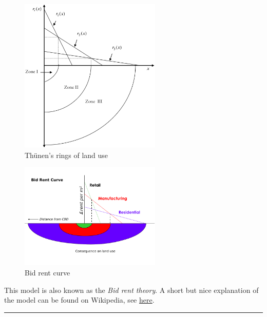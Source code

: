 \documentclass[
  12pt,
  oneside]{book}
\theoremstyle{definition}
\theoremstyle{definition}
\theoremstyle{definition}
\theoremstyle{definition}
\theoremstyle{remark}
\begin{document}
\begin{figure}
\centering
\includegraphics[width=0.6\textwidth,height=\textheight]{fig/thuenen.png}
\caption{\label{fig:thuenen} Thünen's rings of land use}
\end{figure}

\begin{figure}
\centering
\includegraphics[width=0.6\textwidth,height=\textheight]{fig/Bid_rent1.png}
\caption[\label{fig:thuenen2} Bid rent curve]{\label{fig:thuenen2} Bid rent curve\footnotemark{}}
\end{figure}

This model is also known as the \emph{Bid rent theory}. A short but nice explanation of the model can be found on Wikipedia, see \href{https://en.wikipedia.org/wiki/Bid_rent_theory}{here}.

\begin{center}\rule{0.5\linewidth}{0.5pt}\end{center}
\end{document}
